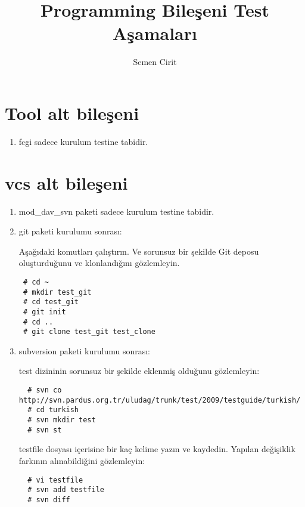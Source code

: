 \documentclass[a4paper,10pt]{article}
\title{Programming Bileşeni Test Aşamaları}
\author{Semen Cirit}
\begin{document}
\maketitle
\section{Tool alt bileşeni}
\begin{enumerate}
 \item fcgi sadece kurulum testine tabidir.
\end{enumerate}

\section{vcs alt bileşeni}
\begin{enumerate}
\item mod\_dav\_svn paketi sadece kurulum testine tabidir.
\item git paketi kurulumu sonrası:

Aşağıdaki komutları çalıştırın. Ve sorunsuz bir şekilde Git deposu oluşturduğunu ve klonlandığını gözlemleyin.
\begin{verbatim}
 # cd ~
 # mkdir test_git
 # cd test_git
 # git init
 # cd ..
 # git clone test_git test_clone
\end{verbatim}

\item subversion paketi kurulumu sonrası:

test dizininin sorunsuz bir şekilde eklenmiş olduğunu gözlemleyin:
\begin{verbatim}
  # svn co http://svn.pardus.org.tr/uludag/trunk/test/2009/testguide/turkish/
  # cd turkish
  # svn mkdir test
  # svn st
 \end{verbatim}
testfile dosyası içerisine bir kaç kelime yazın ve kaydedin. Yapılan değişiklik farkının alınabildiğini gözlemleyin:
\begin{verbatim}
  # vi testfile
  # svn add testfile
  # svn diff
 \end{verbatim}
\end{enumerate}
\end{document}
